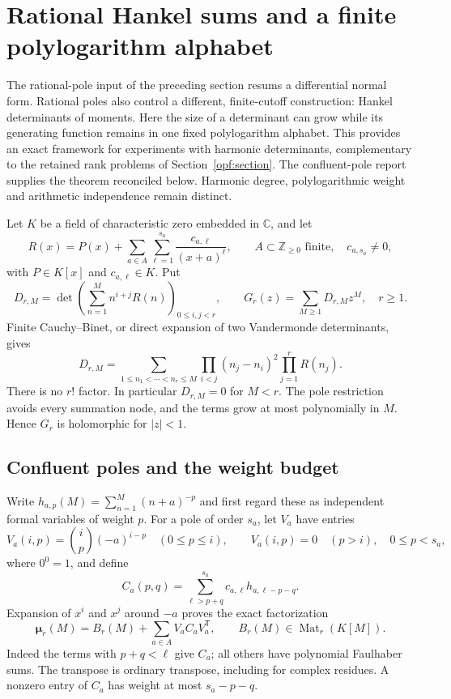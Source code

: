 \section{Rational Hankel sums and a finite polylogarithm alphabet}
\label{rha:section}

The rational-pole input of the preceding section resums a differential
normal form. Rational poles also control a different, finite-cutoff
construction: Hankel determinants of moments. Here the size of a
determinant can grow while its generating function remains in one fixed
polylogarithm alphabet. This provides an exact framework for experiments
with harmonic determinants, complementary to the retained rank problems
of Section~\ref{opf:section}. The confluent-pole report
\cite{rha:reports} supplies the theorem reconciled below. Harmonic degree,
polylogarithmic weight and arithmetic independence remain distinct.

Let $K$ be a field of characteristic zero embedded in $\mathbb C$, and let
\begin{equation}\label{rha:weight}
 R(x)=P(x)+\sum_{a\in A}\sum_{\ell=1}^{s_a}
                 \frac{c_{a,\ell}}{(x+a)^\ell},
 \qquad A\subset\mathbb Z_{\ge0}\text{ finite},\quad c_{a,s_a}\ne0,
\end{equation}
with $P\in K[x]$ and $c_{a,\ell}\in K$. Put
\begin{equation}\label{rha:det}
 D_{r,M}=\det\left(\sum_{n=1}^{M}n^{i+j}R(n)\right)_{0\le i,j<r},
 \qquad G_r(z)=\sum_{M\ge1}D_{r,M}z^M,\quad r\ge1.
\end{equation}
Finite Cauchy--Binet, or direct expansion of two Vandermonde
determinants, gives
\begin{equation}\label{rha:ensemble}
 D_{r,M}=\sum_{1\le n_1<\cdots<n_r\le M}
       \prod_{i<j}(n_j-n_i)^2\prod_{j=1}^{r}R(n_j).
\end{equation}
There is no $r!$ factor. In particular $D_{r,M}=0$ for $M<r$.
The pole restriction avoids every summation node, and the terms grow at
most polynomially in $M$. Hence $G_r$ is holomorphic for $|z|<1$.

\subsection{Confluent poles and the weight budget}

Write $h_{a,p}(M)=\sum_{n=1}^{M}(n+a)^{-p}$ and first regard these
as independent formal variables of weight $p$. For a pole of order $s_a$,
let $V_a$ have entries
\[
 V_a(i,p)=\binom ip(-a)^{i-p}\quad(0\le p\le i),\qquad
 V_a(i,p)=0\quad(p>i),\quad 0\le p<s_a,
\]
where $0^0=1$, and define
\[
 C_a(p,q)=\sum_{\ell>p+q}^{s_a}c_{a,\ell}h_{a,\ell-p-q}.
\]
Expansion of $x^i$ and $x^j$ around $-a$ proves the exact factorization
\begin{equation}\label{rha:factor}
 \boldsymbol\mu_r(M)=B_r(M)+\sum_{a\in A}V_aC_aV_a^{\mathsf T},
                  \qquad B_r(M)\in\operatorname{Mat}_r(K[M]).
\end{equation}
Indeed the terms with $p+q<\ell$ give $C_a$; all others have polynomial
Faulhaber sums. The transpose is ordinary transpose, including for
complex residues. A nonzero entry of $C_a$ has weight at most $s_a-p-q$.

